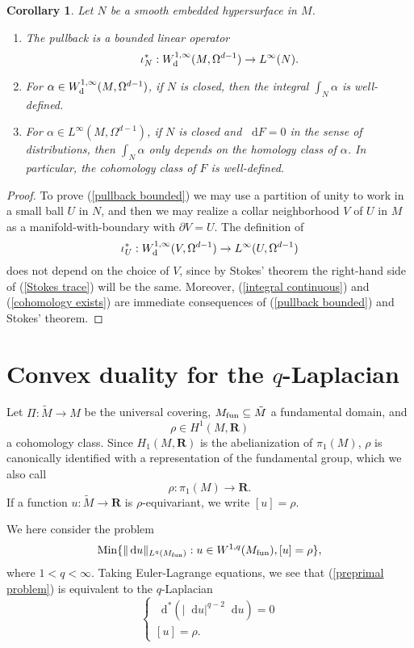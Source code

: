 \documentclass[reqno,11pt]{amsart}
\newcommand{\RR}{\mathbf{R}}
\newcommand*\dif{\mathop{}\!\mathrm{d}}
\newcommand{\Min}{\mathrm{Min}}
\newtheorem{corollary}[theorem]{Corollary}
\theoremstyle{definition}
\numberwithin{equation}{section}
\begin{document}
\begin{corollary}\label{trace on cycles}
Let $N$ be a smooth embedded hypersurface in $M$.
\begin{enumerate}
\item \label{pullback bounded} The pullback is a bounded linear operator
$$\iota^*_N: W^{1, \infty}_{\rm d}(M, \Omega^{d - 1}) \to L^\infty(N).$$
\item \label{integral continuous} For $\alpha \in W^{1, \infty}_{\rm d}(M, \Omega^{d - 1})$, if $N$ is closed, then the integral $\int_N \alpha$ is well-defined.
\item \label{cohomology exists} For $\alpha \in L^\infty(M, \Omega^{d - 1})$, if $N$ is closed and $\dif F = 0$ in the sense of distributions, then $\int_N \alpha$ only depends on the homology class of $\alpha$. In particular, the cohomology class of $F$ is well-defined.
\end{enumerate}
\end{corollary}
\begin{proof}
To prove (\ref{pullback bounded}) we may use a partition of unity to work in a small ball $U$ in $N$, and then we may realize a collar neighborhood $V$ of $U$ in $M$ as a manifold-with-boundary with $\partial V = U$.
The definition of
$$\iota^*_U: W^{1, \infty}_{\rm d}(V, \Omega^{d - 1}) \to L^\infty(U, \Omega^{d - 1})$$
does not depend on the choice of $V$, since by Stokes' theorem the right-hand side of (\ref{Stokes trace}) will be the same.
Moreover, (\ref{integral continuous}) and (\ref{cohomology exists}) are immediate consequences of (\ref{pullback bounded}) and Stokes' theorem.
\end{proof}

\section{Convex duality for the $q$-Laplacian}
Let $\Pi: \tilde M \to M$ be the universal covering, $M_{\rm fun} \subseteq \tilde M$ a fundamental domain, and
$$\rho \in H^1(M, \RR)$$
a cohomology class.
Since $H_1(M, \RR)$ is the abelianization of $\pi_1(M)$, $\rho$ is canonically identified with a representation of the fundamental group, which we also call
$$\rho: \pi_1(M) \to \RR.$$
If a function $u: \tilde M \to \RR$ is $\rho$-equivariant, we write $[u] = \rho$.

We here consider the problem
\begin{equation}\label{preprimal problem}
	\Min\{\|\dif u\|_{L^q(M_{\rm fun})}: u \in W^{1, q}(M_{\rm fun}), [u] = \rho\},
\end{equation}
where $1 < q < \infty$.
Taking Euler-Lagrange equations, we see that (\ref{preprimal problem}) is equivalent to the $q$-Laplacian 
$$\begin{cases}
	\dif^*(|\dif u|^{q - 2} \dif u) = 0 \\
	[u] = \rho.
\end{cases}$$
\end{document}
